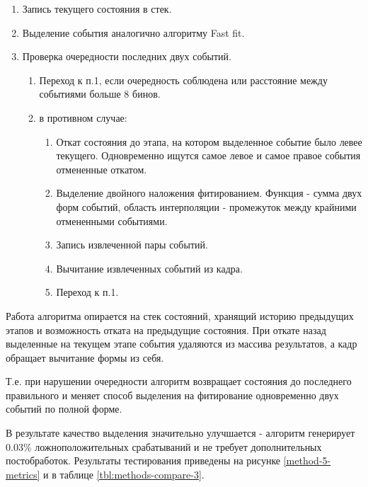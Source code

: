 \documentclass[a4paper,14pt]{extreport}
\begin{document}
\begin{enumerate}
    \item Запись текущего состояния в стек.
    \item Выделение события аналогично алгоритму Fast fit.
    \item Проверка очередности последних двух событий.
    \begin{enumerate}
        \item Переход к п.1, если очередность соблюдена или расстояние между событиями больше 8 бинов.
        \item в противном случае:
        \begin{enumerate}
            \item Откат состояния до этапа, на котором выделенное событие было левее текущего. Одновременно ищутся самое левое и самое правое события отмененные откатом.
            \item Выделение двойного наложения фитированием. Функция - сумма двух форм событий, область интерполяции - промежуток между крайними отмененными событиями.
            \item Запись извлеченной пары событий.
            \item Вычитание извлеченных событий из кадра.
            \item Переход к п.1.
        \end{enumerate}
    \end{enumerate}
\end{enumerate}

Работа алгоритма опирается на стек состояний, хранящий историю предыдущих этапов и возможность отката на предыдущие состояния. При откате назад выделенные на текущем этапе события удаляются из массива результатов, а кадр обращает вычитание формы из себя.

Т.е. при нарушении очередности алгоритм возвращает состояния до последнего правильного и меняет способ выделения на фитирование одновременно двух событий по полной форме.

В результате качество выделения значительно улучшается - алгоритм генерирует 0.03\% ложноположительных срабатываний и не требует дополнительных постобработок. Результаты тестирования приведены на рисунке \ref{method-5-metrics} и в таблице \ref{tbl:methods-compare-3}.
\end{document}
